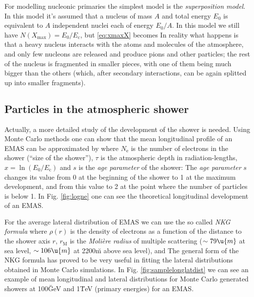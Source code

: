 For modelling nucleonic primaries the simplest model is the
\emph{superposition model}. In this model it's assumed that a nucleus
of mass $A$ and total energy $E_0$ is equivalent to $A$ independent
nuclei each of energy $E_0/A$. In this model we still have
$N(X_{\mathrm{max}}) = E_0 / E_{\mathrm{c}}$, but \eqref{eq:xmaxX}
becomes
%
\NXsimpleHadeq
%
In reality what happens is that a heavy nucleus interacts with the
atoms and molecules of the atmosphere, and only few nucleons are
released and produce pions and other particles; the rest of the
nucleus is fragmented in smaller pieces, with one of them being much
bigger than the others (which, after secondary interactions, can be
again splitted up into smaller fragments).

\subsection{Particles in the atmospheric shower}
%
Actually, a more detailed study of the development of the shower is
needed. Using Monte Carlo methods one can show that the mean
longitudinal profile of an EMAS can be approximated by
%
\Neeq
%
%
where $N_{\mathrm{e}}$ is the number of electrons in the shower
(``size of the shower''), $\tau$ is the atmospheric depth in
radiation-lengths, $x=\ln(E_0/E_{\mathrm{c}})$ and $s$ is the
\emph{age parameter} of the shower:
%
\ageeq
%
The \emph{age parameter} $s$ changes its value from 0 at the beginning
of the shower to 1 at the maximum development, and from this value to
2 at the point where the number of particles is below 1. In Fig.
\ref{fig:logne} one can see the theoretical longitudinal development
of an EMAS.

For the average lateral distribution of EMAS we can use the so called
\emph{NKG formula}
%
\NKGeq
%
where $\rho(r)$ is the density of electrons as a function of the
distance to the shower axis $r$, $r_{\mathrm{M}}$ is the
\emph{Moli{\`e}re radius} of multiple scattering ($\sim 79\u{m}$ at sea
level, $\sim 106\u{m}$ at 2200\u{m} above sea level), and
%
\fsreq
%
The general form of the NKG formula has proved to be very useful in
fitting the lateral distributions obtained in Monte Carlo
simulations. In Fig. \ref{fig:samplelonglatdist} we can see an example of
mean longitudinal and lateral distributions for Monte Carlo generated
showers at 100\u{GeV} and 1\u{TeV} (primary energies) for an EMAS.

\lognefig

